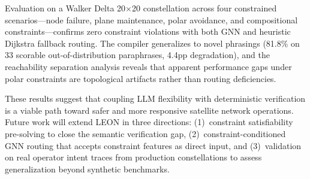 \documentclass[10pt, conference, letterpaper]{IEEEtran}
\begin{document}
Evaluation on a Walker Delta 20$\times$20 constellation across
four constrained scenarios---node failure, plane maintenance,
polar avoidance, and compositional constraints---confirms zero
constraint violations with both GNN and heuristic Dijkstra fallback routing. The compiler generalizes to novel phrasings (81.8\%
on 33 scorable out-of-distribution paraphrases, 4.4pp degradation),
and the reachability separation analysis reveals that apparent
performance gaps under polar constraints are topological artifacts
rather than routing deficiencies.

These results suggest that coupling LLM flexibility with deterministic
verification is a viable path toward safer and more responsive
satellite network operations. Future work will extend LEON in three
directions: (1)~constraint satisfiability pre-solving to close the
semantic verification gap, (2)~constraint-conditioned GNN routing
that accepts constraint features as direct input, and (3)~validation
on real operator intent traces from production constellations to
assess generalization beyond synthetic benchmarks.
\end{document}
